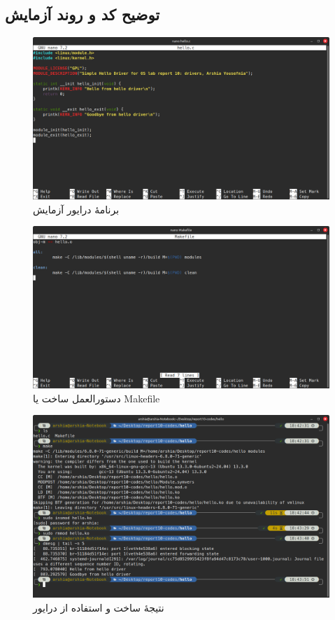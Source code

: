 \documentclass[12pt]{article}
\begin{document}
	\subsection{توضیح کد و روند آزمایش}
	\begin{figure}[H]
		\centering
		\includegraphics[width=\textwidth]{report10-resources/screenshots/1.png}
		\caption{برنامهٔ درایور آزمایش}
		\label{img:1}
	\end{figure}
	\begin{figure}[H]
		\centering
		\includegraphics[width=\textwidth]{report10-resources/screenshots/2.png}
		\caption{دستورالعمل ساخت یا \textenglish{Makefile}}
		\label{img:2}
	\end{figure}
	\begin{figure}[H]
		\centering
		\includegraphics[width=\textwidth]{report10-resources/screenshots/3.png}
		\caption{نتیجهٔ ساخت و استفاده از درایور}
		\label{img:3}
	\end{figure}
\end{document}
